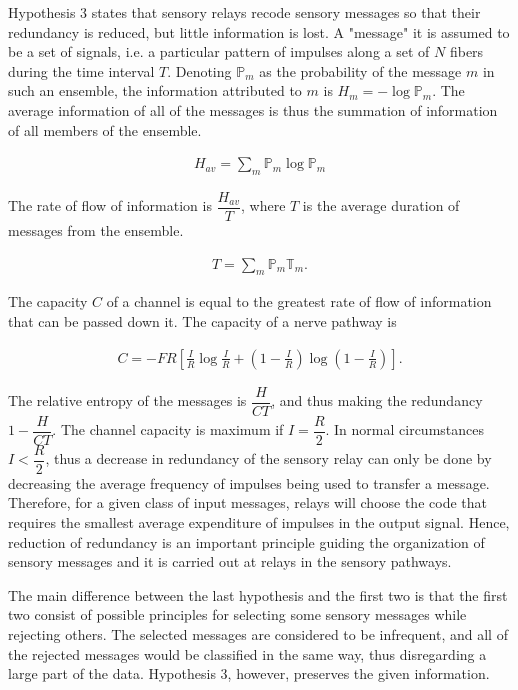 \documentclass[twoside]{article}
\begin{document}
\begin{multicols}{2}
Hypothesis 3 states that sensory relays recode sensory messages so that their redundancy is reduced, but little information is lost. A "message" it is assumed to be a set of signals, i.e. a particular pattern of impulses along a set of $N$ fibers during the time interval $T$. Denoting $\mathbb{P}_m$ as the probability of the message $m$ in such an ensemble, the information attributed to $m$ is $H_{m}=-\log \mathbb{P}_m$. The average information of all of the messages is thus the summation of information of all members of the ensemble.

\begin{align} \label{eq:1}
	H_{av}= \sum_m \mathbb{P}_m \log \mathbb{P}_m
\end{align}

The rate of flow of information is $\dfrac{H_{av}}{T}$, where $T$ is the average duration of messages from the ensemble.

\begin{align} \label{eq:2}
	T = \sum_m \mathbb{P}_m \mathbb{T}_m.
\end{align}

The capacity $C$ of a channel is equal to the greatest rate of flow of information that can be passed down it. The capacity of a nerve pathway is

\begin{align} \label{eq:3}
	C = - FR \left[\frac{I}{R} \log \frac{I}{R} +\left(1-\frac{I}{R} \right) \log  \left(1-\frac{I}{R} \right) \right].
\end{align}

The relative entropy of the messages is $\dfrac{H}{CT}$, and thus making the redundancy $1-\dfrac{H}{CT}$. The channel capacity is maximum if $I = \dfrac{R}2$. In normal circumstances $I < \dfrac{R}{2}$, thus a decrease in redundancy of the sensory relay can only be done by decreasing the average frequency of impulses being used to transfer a message. Therefore, for a given class of input messages, relays will choose the code that requires the smallest average expenditure of impulses in the output signal. Hence, reduction of redundancy is an important principle guiding the organization of sensory messages and it is carried out at relays in the sensory pathways.

The main difference between the last hypothesis and the first two is that the first two consist of possible principles for selecting some sensory messages while rejecting others. The selected messages are considered to be infrequent, and all of the rejected messages would be classified in the same way, thus disregarding a large part of the data. Hypothesis 3, however, preserves the given information.


\end{multicols}
\end{document}
